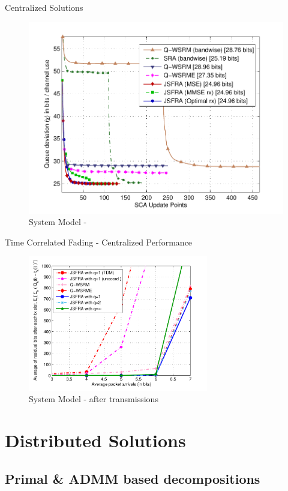 \documentclass[9pt]{beamer}
\begin{document}
\begin{frame}{Centralized Solutions}
	\begin{figure}
		\centering
		\includegraphics[width=0.7\columnwidth]{fig-2-5}
		\caption{System Model - }
	\end{figure}
\end{frame}

\begin{frame}{Time Correlated Fading - Centralized Performance}
	\begin{figure}
		\centering
		\includegraphics[width=0.7\textwidth]{average_queue_over_time-3}
		\caption{System Model -  after  transmissions}
	\end{figure}
\end{frame}

\section{Distributed Solutions}

\subsection{Primal \& \acs{ADMM} based decompositions}
\end{document}
